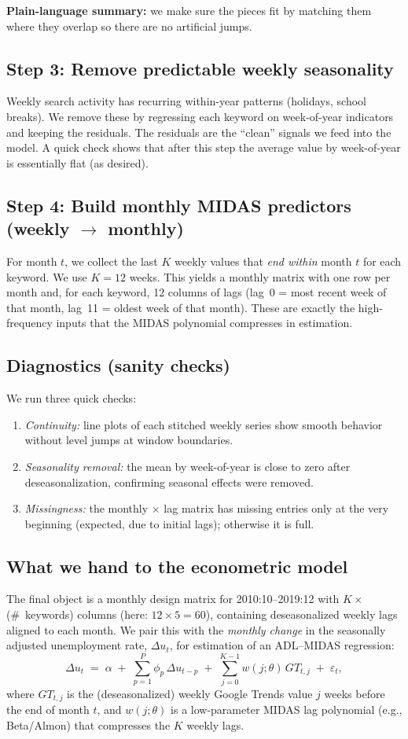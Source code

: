 \documentclass{article}
\begin{document}
\noindent\textbf{Plain-language summary:} we make sure the pieces fit by matching them where they overlap so there are no artificial jumps.

\subsection{Step 3: Remove predictable weekly seasonality}
Weekly search activity has recurring within-year patterns (holidays, school breaks). We remove these by regressing each keyword on week-of-year indicators and keeping the residuals. The residuals are the ``clean'' signals we feed into the model. A quick check shows that after this step the average value by week-of-year is essentially flat (as desired).

\subsection{Step 4: Build monthly MIDAS predictors (weekly $\rightarrow$ monthly)}
For month $t$, we collect the last $K$ weekly values that \emph{end within} month $t$ for each keyword. We use $K=12$ weeks. This yields a monthly matrix with one row per month and, for each keyword, 12 columns of lags (lag~0 = most recent week of that month, lag~11 = oldest week of that month). These are exactly the high-frequency inputs that the MIDAS polynomial compresses in estimation.

\subsection{Diagnostics (sanity checks)}
We run three quick checks:
\begin{enumerate}
  \item \emph{Continuity:} line plots of each stitched weekly series show smooth behavior without level jumps at window boundaries.
  \item \emph{Seasonality removal:} the mean by week-of-year is close to zero after deseasonalization, confirming seasonal effects were removed.
  \item \emph{Missingness:} the monthly $\times$ lag matrix has missing entries only at the very beginning (expected, due to initial lags); otherwise it is full.
\end{enumerate}

\subsection{What we hand to the econometric model}
The final object is a monthly design matrix for 2010:10–2019:12 with $K \times$ (\#~keywords) columns (here: $12 \times 5 = 60$), containing deseasonalized weekly lags aligned to each month. We pair this with the \emph{monthly change} in the seasonally adjusted unemployment rate, $\Delta u_t$, for estimation of an ADL–MIDAS regression:
\[
\Delta u_t \;=\; \alpha \;+\; \sum_{p=1}^{P}\phi_p\, \Delta u_{t-p}
\;+\; \sum_{j=0}^{K-1} w(j;\theta)\,GT_{t,j} \;+\; \varepsilon_t,
\]
where $GT_{t,j}$ is the (deseasonalized) weekly Google Trends value $j$ weeks before the end of month $t$, and $w(j;\theta)$ is a low-parameter MIDAS lag polynomial (e.g., Beta/Almon) that compresses the $K$ weekly lags.
\end{document}
